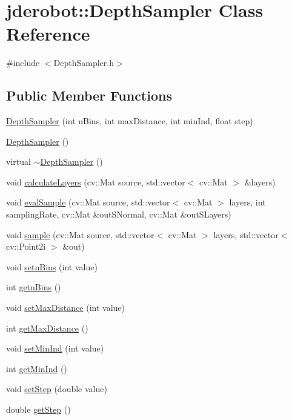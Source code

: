 \hypertarget{classjderobot_1_1_depth_sampler}{}\section{jderobot\+:\+:Depth\+Sampler Class Reference}
\label{classjderobot_1_1_depth_sampler}


{\ttfamily \#include $<$Depth\+Sampler.\+h$>$}

\subsection*{Public Member Functions}
\begin{DoxyCompactItemize}
\item 
\hyperlink{classjderobot_1_1_depth_sampler_accca5c92982fbcdab35b077be7ec4171}{Depth\+Sampler} (int n\+Bins, int max\+Distance, int min\+Ind, float step)
\item 
\hyperlink{classjderobot_1_1_depth_sampler_a77a5834945c0d4aaf9024b77ff08c3ae}{Depth\+Sampler} ()
\item 
virtual \hyperlink{classjderobot_1_1_depth_sampler_a7423eb098eeab7f2e58e375389b72bcd}{$\sim$\+Depth\+Sampler} ()
\item 
void \hyperlink{classjderobot_1_1_depth_sampler_abd92df0e1e72431b2297344ff6d7dd78}{calculate\+Layers} (cv\+::\+Mat source, std\+::vector$<$ cv\+::\+Mat $>$ \&layers)
\item 
void \hyperlink{classjderobot_1_1_depth_sampler_a208a3898c54c443647ad5116044041e8}{eval\+Sample} (cv\+::\+Mat source, std\+::vector$<$ cv\+::\+Mat $>$ layers, int sampling\+Rate, cv\+::\+Mat \&out\+S\+Normal, cv\+::\+Mat \&out\+S\+Layers)
\item 
void \hyperlink{classjderobot_1_1_depth_sampler_ac8dda5c26e30a21ad5a23d9421eb732e}{sample} (cv\+::\+Mat source, std\+::vector$<$ cv\+::\+Mat $>$ layers, std\+::vector$<$ cv\+::\+Point2i $>$ \&out)
\item 
void \hyperlink{classjderobot_1_1_depth_sampler_ac3c4d83a723a16b2c66f5999de69fadb}{setn\+Bins} (int value)
\item 
int \hyperlink{classjderobot_1_1_depth_sampler_a2d2b5c3abfa476965341cf7d4246d654}{getn\+Bins} ()
\item 
void \hyperlink{classjderobot_1_1_depth_sampler_a33513f22328330f20c574d5d95f094ce}{set\+Max\+Distance} (int value)
\item 
int \hyperlink{classjderobot_1_1_depth_sampler_afcd72cfcec0c2858676e5d2de9c1a447}{get\+Max\+Distance} ()
\item 
void \hyperlink{classjderobot_1_1_depth_sampler_a56f8d0604fb9e97cc295baad9092d3b6}{set\+Min\+Ind} (int value)
\item 
int \hyperlink{classjderobot_1_1_depth_sampler_a158f58f94935280fa5eedaab9356b51e}{get\+Min\+Ind} ()
\item 
void \hyperlink{classjderobot_1_1_depth_sampler_ad5dc4b9beb677e517e7c7ad87b16720b}{set\+Step} (double value)
\item 
double \hyperlink{classjderobot_1_1_depth_sampler_a6694d0f60a6bacd72d304cb6b0dd46bc}{get\+Step} ()
\end{DoxyCompactItemize}


